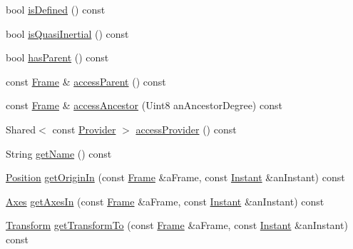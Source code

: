 \begin{DoxyCompactItemize}
bool \hyperlink{classlibrary_1_1physics_1_1coord_1_1_frame_ad5a450dd6740fc5a27473e661375dde6}{is\+Defined} () const
\item 
bool \hyperlink{classlibrary_1_1physics_1_1coord_1_1_frame_a894d1ac6152e28dbb749058ca6ffd663}{is\+Quasi\+Inertial} () const
\item 
bool \hyperlink{classlibrary_1_1physics_1_1coord_1_1_frame_afd83dec4bf4e2aabc2b31019b282965e}{has\+Parent} () const
\item 
const \hyperlink{classlibrary_1_1physics_1_1coord_1_1_frame}{Frame} \& \hyperlink{classlibrary_1_1physics_1_1coord_1_1_frame_aaa33dd0c2af00aee0ffb4278cccdc8a2}{access\+Parent} () const
\item 
const \hyperlink{classlibrary_1_1physics_1_1coord_1_1_frame}{Frame} \& \hyperlink{classlibrary_1_1physics_1_1coord_1_1_frame_a82db48e361c6804146083c7478a2528f}{access\+Ancestor} (Uint8 an\+Ancestor\+Degree) const
\item 
Shared$<$ const \hyperlink{classlibrary_1_1physics_1_1coord_1_1frame_1_1_provider}{Provider} $>$ \hyperlink{classlibrary_1_1physics_1_1coord_1_1_frame_a5da9096ace352a91d272677cc159c059}{access\+Provider} () const
\item 
String \hyperlink{classlibrary_1_1physics_1_1coord_1_1_frame_afec582db83d2bf93b2b070f8557ee760}{get\+Name} () const
\item 
\hyperlink{classlibrary_1_1physics_1_1coord_1_1_position}{Position} \hyperlink{classlibrary_1_1physics_1_1coord_1_1_frame_a3cdd1a0db22e1112c48cff6f8d8607d5}{get\+Origin\+In} (const \hyperlink{classlibrary_1_1physics_1_1coord_1_1_frame}{Frame} \&a\+Frame, const \hyperlink{classlibrary_1_1physics_1_1time_1_1_instant}{Instant} \&an\+Instant) const
\item 
\hyperlink{classlibrary_1_1physics_1_1coord_1_1_axes}{Axes} \hyperlink{classlibrary_1_1physics_1_1coord_1_1_frame_a6d5c6a2f3b821c4bc621fa75cccdf333}{get\+Axes\+In} (const \hyperlink{classlibrary_1_1physics_1_1coord_1_1_frame}{Frame} \&a\+Frame, const \hyperlink{classlibrary_1_1physics_1_1time_1_1_instant}{Instant} \&an\+Instant) const
\item 
\hyperlink{classlibrary_1_1physics_1_1coord_1_1_transform}{Transform} \hyperlink{classlibrary_1_1physics_1_1coord_1_1_frame_ac60457a6704a977a7ef088bc4ea249f6}{get\+Transform\+To} (const \hyperlink{classlibrary_1_1physics_1_1coord_1_1_frame}{Frame} \&a\+Frame, const \hyperlink{classlibrary_1_1physics_1_1time_1_1_instant}{Instant} \&an\+Instant) const
\end{DoxyCompactItemize}
